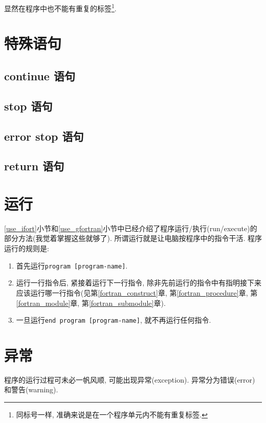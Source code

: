 显然在程序中也不能有重复的标签\footnote{
    同标号一样, 准确来说是在一个程序单元内不能有重复标签.
}.

\section{特殊语句}

\subsection{continue 语句}

\subsection{stop 语句}

\subsection{error stop 语句}

\subsection{return 语句}

\section{运行}\label{run_fortran}

\ref{use_ifort}小节和\ref{use_gfortran}小节中已经介绍了程序运行/执行(run/execute)的部分方法(我觉着掌握这些就够了). 所谓运行就是让电脑按程序中的指令干活. 程序运行的规则是:
\begin{enumerate}
    \item 首先运行\texttt{program [program-name]}.
    \item 运行一行指令后, 紧接着运行下一行指令, 除非先前运行的指令中有指明接下来应该运行哪一行指令(见第\ref{fortran_construct}章, 第\ref{fortran_procedure}章, 第\ref{fortran_module}章, 第\ref{fortran_submodule}章).
    \item 一旦运行\texttt{end program [program-name]}, 就不再运行任何指令.
\end{enumerate}

\section{异常}\label{fortran_exception}

程序的运行过程可未必一帆风顺, 可能出现异常(exception). 异常分为错误(error)和警告(warning).

